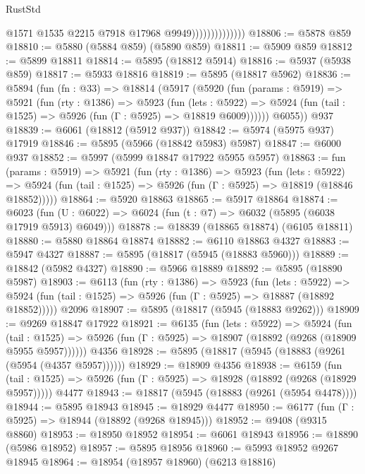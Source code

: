 \begin{lexlean}{RustStd}
\begin{coremodule}
{{                                @1571
                                @1535
                                @2215
                                @7918
                                @17968
                                @9949))))))))))))))
@18806 := @5878 @859
@18810 := @5880 (@5884 @859) (@5890 @859)
@18811 := @5909 @859
@18812 := @5899 @18811
@18814 := @5895 (@18812 @5914)
@18816 := @5937 (@5938 @859)
@18817 := @5933 @18816
@18819 := @5895 (@18817 @5962)
@18836 := @5894
    (fun (fn : @33) =>
    @18814
      (@5917
        (@5920
          (fun (params : @5919) =>
          @5921
            (fun (rty : @1386) =>
            @5923
              (fun (lets : @5922) =>
              @5924 (fun (tail : @1525) => @5926 (fun (Γ : @5925) => @18819 @6009))))))
        @6055))
    @937
@18839 := @6061 (@18812 (@5912 @937))
@18842 := @5974 (@5975 @937) @17919
@18846 := @5895 (@5966 (@18842 @5983) @5987)
@18847 := @6000 @937
@18852 := @5997 (@5999 @18847 @17922 @5955 @5957)
@18863 := fun (params : @5919) =>
  @5921
    (fun (rty : @1386) =>
    @5923
      (fun (lets : @5922) =>
      @5924 (fun (tail : @1525) => @5926 (fun (Γ : @5925) => @18819 (@18846 @18852)))))
@18864 := @5920 @18863
@18865 := @5917 @18864
@18874 := @6023
    (fun (U : @6022) => @6024 (fun (t : @7) => @6032 (@5895 (@6038 @17919 @5913) @6049)))
@18878 := @18839 (@18865 @18874) (@6105 @18811)
@18880 := @5880 @18864 @18874
@18882 := @6110 @18863 @4327
@18883 := @5947 @4327
@18887 := @5895 (@18817 (@5945 (@18883 @5960)))
@18889 := @18842 (@5982 @4327)
@18890 := @5966 @18889
@18892 := @5895 (@18890 @5987)
@18903 := @6113
    (fun (rty : @1386) =>
    @5923
      (fun (lets : @5922) =>
      @5924 (fun (tail : @1525) => @5926 (fun (Γ : @5925) => @18887 (@18892 @18852)))))
    @2096
@18907 := @5895 (@18817 (@5945 (@18883 @9262)))
@18909 := @9269 @18847 @17922
@18921 := @6135
    (fun (lets : @5922) =>
    @5924
      (fun (tail : @1525) =>
      @5926 (fun (Γ : @5925) => @18907 (@18892 (@9268 (@18909 @5955 @5957))))))
    @4356
@18928 := @5895 (@18817 (@5945 (@18883 (@9261 (@5954 (@4357 @5957))))))
@18929 := @18909 @4356
@18938 := @6159
    (fun (tail : @1525) => @5926 (fun (Γ : @5925) => @18928 (@18892 (@9268 (@18929 @5957)))))
    @4477
@18943 := @18817 (@5945 (@18883 (@9261 (@5954 @4478))))
@18944 := @5895 @18943
@18945 := @18929 @4477
@18950 := @6177 (fun (Γ : @5925) => @18944 (@18892 (@9268 @18945)))
@18952 := @9408 (@9315 @8860)
@18953 := @18950 @18952
@18954 := @6061 @18943
@18956 := @18890 (@5986 @18952)
@18957 := @5895 @18956
@18960 := @5993 @18952 @9267 @18945
@18964 := @18954 (@18957 @18960) (@6213 @18816)
}}
\end{coremodule}
\end{lexlean}
